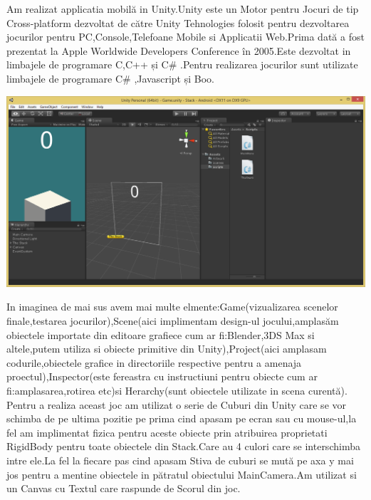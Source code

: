 Am realizat applicatia mobilă in Unity.Unity este un Motor pentru Jocuri de tip Cross-platform dezvoltat de către Unity Tehnologies folosit pentru dezvoltarea jocurilor pentru PC,Console,Telefoane Mobile si Applicatii Web.Prima dată a fost prezentat la Apple Worldwide Developers Conference în 2005.Este dezvoltat in limbajele de programare C,C++ și C\# .Pentru realizarea jocurilor sunt utilizate limbajele de programare C\# ,Javascript și Boo.
\begin{center}
\includegraphics[scale=0.5]{images/Main}
\end{center}
In imaginea de mai sus avem mai multe elmente:Game(vizualizarea scenelor finale,testarea jocurilor),Scene(aici implimentam design-ul jocului,amplasăm obiectele importate din editoare grafiece cum ar fi:Blender,3DS Max si altele,putem utiliza si obiecte primitive din Unity),Project(aici amplasam codurile,obiectele grafice in directoriile respective pentru a amenaja proectul),Inspector(este fereastra cu instructiuni pentru obiecte cum ar fi:amplasarea,rotirea etc)si Herarchy(sunt obiectele utilizate in scena curentă).\\

Pentru a realiza aceast joc am utilizat o serie de Cuburi din Unity care se vor schimba de pe ultima pozitie pe prima cind apasam pe ecran sau cu mouse-ul,la fel am implimentat fizica pentru aceste obiecte prin atribuirea proprietati RigidBody pentru toate obiectele din Stack.Care au 4 culori care se interschimba intre ele.La fel la fiecare pas cind apasam Stiva de cuburi se mută pe axa y mai jos pentru a mentine obiectele in pătratul obiectului MainCamera.Am utilizat si un Canvas cu Textul care raspunde de Scorul din joc.

